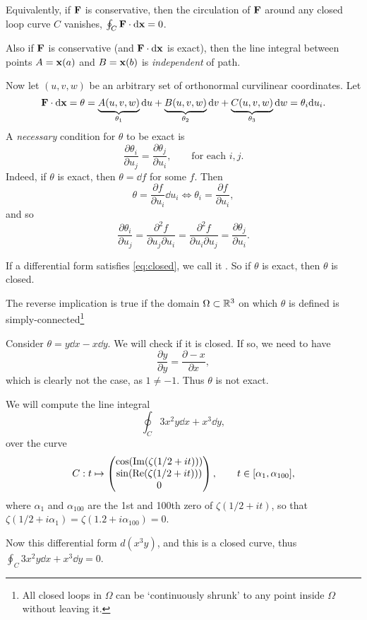 \documentclass[a4paper]{scrreprt}
\begin{document}
Equivalently, if $\mathbf{F}$ is conservative, then the circulation of $\mathbf{F}$ around any closed loop curve $C$ vanishes,  $\oint_C \mathbf{F} \cdot \mathrm{d} \mathbf{x} = 0$.

Also if $\mathbf{F}$ is conservative (and $\mathbf{F} \cdot \mathrm{d} \mathbf{x}$ is exact), then the line integral between points $A = \mathbf{x}(a)$ and $B = \mathbf{x}(b)$ is \emph{independent} of path.

Now let $(u, v, w)$ be an arbitrary set of orthonormal curvilinear coordinates. Let
$$
\mathbf{F} \cdot \mathrm{d} \mathbf{x} = \theta = \underbrace{A(u, v, w)}_{\theta_1} \mathrm{d} u + \underbrace{B(u, v, w)}_{\theta_2} \mathrm{d} v + \underbrace{C(u, v, w)}_{\theta_3} \mathrm{d} w = \theta_i \mathrm{d} u_i.
$$
A \emph{necessary} condition for $\theta$ to be exact is
$$
	\frac{\partial \theta_i}{\partial u_j} = \frac{\partial \theta_j}{\partial u_i}, \quad \quad \text{for each }i, j.
$$
Indeed, if $\theta$ is exact, then $\theta = \dd f$ for some $f$. Then
\begin{equation}\label{eq:closed}
	\theta = \frac{\partial f}{\partial u_i} \dd u_i \iff \theta_i = \frac{\partial f}{\partial u_i},\tag{$*$}
\end{equation}
and so
$$
	\frac{\partial \theta_i}{\partial u_j} = \frac{\partial^2 f}{\partial u_j \partial u_i} = \frac{\partial^2 f}{\partial u_i \partial u_j} = \frac{\partial \theta_j}{ \partial u_i}.
$$

If a differential form satisfies \eqref{eq:closed}, we call it . So if $\theta$ is exact, then $\theta$ is closed.

The reverse implication is true if the domain $\Omega \subset \mathbb{R}^3$ on which $\theta$ is defined is simply-connected\footnote{All closed loops in $\Omega$ can be `continuously shrunk' to any point inside $\Omega$ without leaving it.}

\begin{example}
	Consider $\theta = y \dd x - x \dd y$. We will check if it is closed. If so, we need to have
	$$
	\frac{\partial y}{\partial y} = \frac{\partial -x}{\partial x},
	$$
	which is clearly not the case, as $1 \neq -1$. Thus $\theta$ is not exact.
\end{example}

\begin{example}
	We will compute the line integral
	$$
	\oint_C 3x^2 y \dd x + x^3 \dd y,
	$$
	over the curve
	$$
	C: t \mapsto \begin{pmatrix}
		\cos(\operatorname{Im}(\zeta(1/2 + it))) \\
		\sin(\operatorname{Re}(\zeta(1/2 + it))) \\
		0
	\end{pmatrix}, \quad \quad t \in [\alpha_1, \alpha_{100}],
	$$
	where $\alpha_1$ and $\alpha_{100}$ are the 1st and 100th zero of $\zeta(1/2 + it)$, so that $\zeta(1/2 + i \alpha_1) = \zeta(1.2 + i \alpha_{100}) = 0$.
	
	Now this differential form $d(x^3 y)$, and this is a closed curve, thus $\oint_C 3x^2 y \dd x + x^3 \dd y = 0$.
\end{example}
\end{document}
